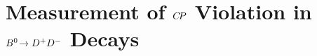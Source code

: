 
\chapter[Measurement of \texorpdfstring{$\CP$}{CP} Violation in \texorpdfstring{$\BdToDD$}{Bd2DD} Decays (25 pages)]{Measurement of \texorpdfstring{$\CP$}{CP} Violation in \texorpdfstring{$\BdToDD$}{Bd2DD} Decays}
\label{sec:b02dd}







